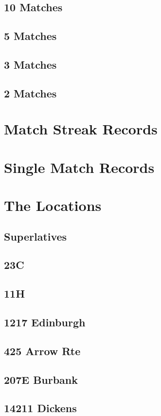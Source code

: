     \section{10 Matches}
    \section{5 Matches}
    \section{3 Matches}
    \section{2 Matches}
  \chapter{Match Streak Records}
  \chapter{Single Match Records}
  \chapter{The Locations}
    \section{Superlatives}
    \section{23C}
    \section{11H}
    \section{1217 Edinburgh}
    \section{425 Arrow Rte}
    \section{207E Burbank} 
    \section{14211 Dickens}
